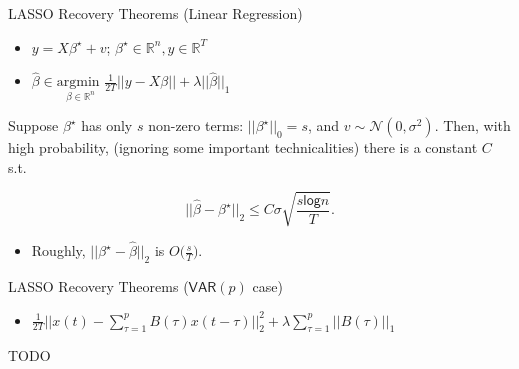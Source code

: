 \documentclass{beamer} %
\def\VAR{\mathsf{VAR}}  %
\def\R{\mathbb{R}}  %
\begin{document}
\begin{frame}{LASSO Recovery Theorems (Linear Regression)}
  \begin{itemize}
    \item{$y = X\beta^\star + v$; $\beta^\star \in \R^n, y \in \R^T$}\pause
    \item{$\widehat{\beta} \in \underset{\beta \in \R^n}{\text{argmin }} \frac{1}{2T}||y - X\beta|| + \lambda ||\widehat{\beta}||_1$}\pause
  \end{itemize}

  \begin{theorem}[Wainwright 2006]
    Suppose $\beta^\star$ has only $s$ non-zero terms:
    $||\beta^\star||_0 = s$, and $v \sim \mathcal{N}(0, \sigma^2)$.
    \pause Then, with high probability, (ignoring some important
    technicalities) there is a constant $C$ s.t. \pause

    \begin{equation*}
      ||\widehat{\beta} - \beta^\star||_2 \le C \sigma \sqrt{\frac{s \mathsf{log } n}{T}}.
    \end{equation*}
  \end{theorem}

  \begin{itemize}
    \item{Roughly, $||\beta^\star - \widehat{\beta}||_2$ is $O\big(\frac{s}{T}\big)$.}
  \end{itemize}
\end{frame}

\begin{frame}{LASSO Recovery Theorems ($\VAR(p)$ case)}
  \begin{itemize}
    \item{$\frac{1}{2T}||x(t) - \sum_{\tau = 1}^p B(\tau)x(t - \tau)||_2^2 + \lambda \sum_{\tau = 1}^p ||B(\tau)||_1$}\pause
  \end{itemize}
  TODO
\end{frame}
\end{document}
